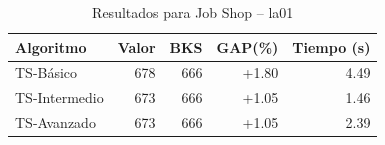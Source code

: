 \begin{table}[h]
\centering
\caption{Resultados para Job Shop -- la01}
\label{tab:jobshop_la01}
\begin{tabular}{lrrrr}
\hline
\textbf{Algoritmo} & \textbf{Valor} & \textbf{BKS} & \textbf{GAP(\%)} & \textbf{Tiempo (s)} \\
\hline
TS-Básico & 678 & 666 & +1.80 & 4.49 \\
TS-Intermedio & 673 & 666 & +1.05 & 1.46 \\
TS-Avanzado & 673 & 666 & +1.05 & 2.39 \\
\hline
\end{tabular}
\end{table}
